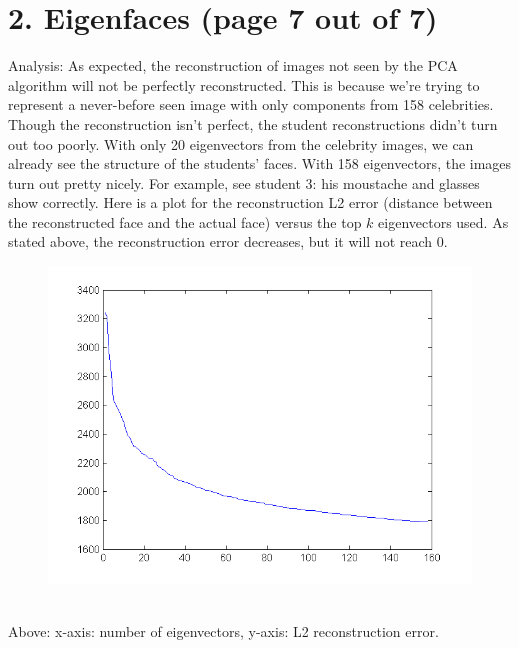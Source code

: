 \documentclass[11pt]{article}
\begin{document}
\section*{2. Eigenfaces (page 7 out of 7)}
Analysis: As expected, the reconstruction of images not seen by the PCA algorithm will not be perfectly reconstructed. This is because we're trying to represent a never-before seen image with only components from 158 celebrities. Though the reconstruction isn't perfect, the student reconstructions didn't turn out too poorly. With only 20 eigenvectors from the celebrity images, we can already see the structure of the students' faces. With 158 eigenvectors, the images turn out pretty nicely. For example, see student 3: his moustache and glasses show correctly. Here is a plot for the reconstruction L2 error (distance between the reconstructed face and the actual face) versus the top $k$ eigenvectors used. As stated above, the reconstruction error decreases, but it will not reach 0. \\
\begin{figure}[ht!]
\centering
\includegraphics[width=180mm]{images/hw7q2cerror.png}
\label{overflow}
\end{figure} \\
Above: x-axis: number of eigenvectors, y-axis: L2 reconstruction error.
\newpage
\end{document}
